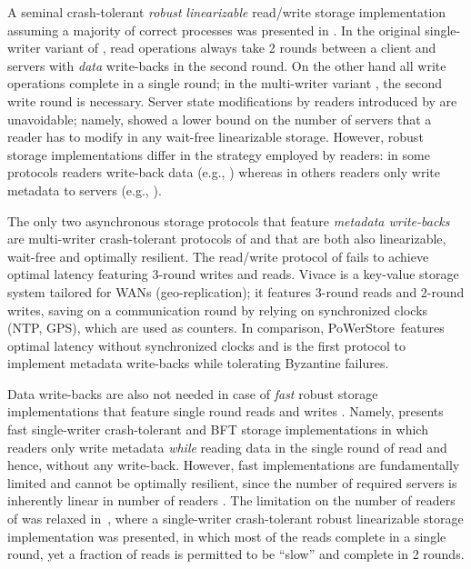 \documentclass[10pt,conference,compsocconf]{IEEEtran}
\newcommand{\protocol}{PoWerStore}
\begin{document}
A seminal crash-tolerant \emph{robust} \emph{linearizable} read/write storage implementation assuming a majority of correct processes was presented in \cite{ABND95}. In the original single-writer variant of \cite{ABND95},  read operations always take 2 rounds between a client and servers with \emph{data} write-backs in the second round. On the other hand all write operations complete in a single round; in the multi-writer variant \cite{LS02}, the second write round is necessary. Server state modifications by readers introduced by \cite{ABND95} are unavoidable; namely, \cite{FL03} showed a  lower bound on the number of servers that a reader has to modify in any wait-free linearizable storage. However, robust storage implementations differ in the strategy employed by readers: in some protocols readers write-back data (e.g., \cite{ABND95,Phalanx,AAB07,GNS09,GV10,DGM11}) whereas in others readers only write metadata to servers (e.g., \cite{FL03,DGLV10,CA12}).

The only two asynchronous storage protocols that feature \emph{metadata write-backs} are multi-writer crash-tolerant protocols of \cite{FL03} and \cite{CA12} that are both also linearizable, wait-free and optimally resilient. The read/write protocol of \cite{FL03} fails to achieve optimal latency featuring 3-round writes and reads. Vivace \cite{CA12} is a key-value storage system tailored for WANs (geo-replication); it features 3-round reads and 2-round writes, saving on a communication round by relying on synchronized clocks (NTP, GPS), which are used as counters. In comparison, \protocol\ features optimal latency without synchronized clocks and is the first protocol to implement metadata write-backs while tolerating Byzantine failures.

Data write-backs are also not needed in case of \emph{fast} robust storage implementations that feature single round reads and writes \cite{DGLV10}. Namely, \cite{DGLV10} presents fast single-writer crash-tolerant and BFT storage implementations in which readers only write metadata \emph{while} reading data in the single round of read and hence, without any write-back. However, fast implementations are fundamentally limited and cannot be optimally resilient, since the number of required servers is inherently linear in number of readers \cite{DGLV10}. The limitation on the number of readers of \cite{DGLV10} was relaxed in~\cite{GNS09}, where a single-writer crash-tolerant robust linearizable storage implementation was presented, in which most of the reads complete in a single round, yet a fraction of reads is permitted to be ``slow'' and complete in 2 rounds.
\end{document}
